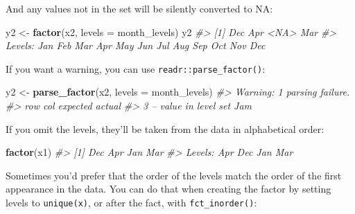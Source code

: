 \documentclass[]{book}
\newenvironment{Shaded}{\begin{snugshade}}{\end{snugshade}}
\newcommand{\KeywordTok}[1]{\textcolor[rgb]{0.13,0.29,0.53}{\textbf{{#1}}}}
\newcommand{\DataTypeTok}[1]{\textcolor[rgb]{0.13,0.29,0.53}{{#1}}}
\newcommand{\StringTok}[1]{\textcolor[rgb]{0.31,0.60,0.02}{{#1}}}
\newcommand{\CommentTok}[1]{\textcolor[rgb]{0.56,0.35,0.01}{\textit{{#1}}}}
\newcommand{\NormalTok}[1]{{#1}}
\begin{document}
And any values not in the set will be silently converted to NA:

\begin{Shaded}
\begin{Highlighting}[]
\NormalTok{y2 <-}\StringTok{ }\KeywordTok{factor}\NormalTok{(x2, }\DataTypeTok{levels =} \NormalTok{month_levels)}
\NormalTok{y2}
\CommentTok{#> [1] Dec  Apr  <NA> Mar }
\CommentTok{#> Levels: Jan Feb Mar Apr May Jun Jul Aug Sep Oct Nov Dec}
\end{Highlighting}
\end{Shaded}

If you want a warning, you can use \texttt{readr::parse\_factor()}:

\begin{Shaded}
\begin{Highlighting}[]
\NormalTok{y2 <-}\StringTok{ }\KeywordTok{parse_factor}\NormalTok{(x2, }\DataTypeTok{levels =} \NormalTok{month_levels)}
\CommentTok{#> Warning: 1 parsing failure.}
\CommentTok{#> row col           expected actual}
\CommentTok{#>   3  -- value in level set    Jam}
\end{Highlighting}
\end{Shaded}

If you omit the levels, they'll be taken from the data in alphabetical
order:

\begin{Shaded}
\begin{Highlighting}[]
\KeywordTok{factor}\NormalTok{(x1)}
\CommentTok{#> [1] Dec Apr Jan Mar}
\CommentTok{#> Levels: Apr Dec Jan Mar}
\end{Highlighting}
\end{Shaded}

Sometimes you'd prefer that the order of the levels match the order of
the first appearance in the data. You can do that when creating the
factor by setting levels to \texttt{unique(x)}, or after the fact, with
\texttt{fct\_inorder()}:

\begin{Shaded}
\end{Shaded}
\end{document}
